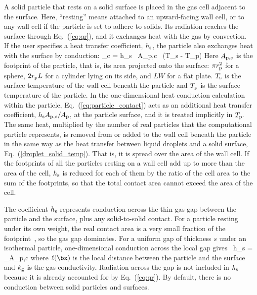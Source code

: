 A solid particle that rests on a solid surface is placed in the gas cell adjacent to the surface. Here, ``resting'' means attached to an upward-facing wall cell, or to any wall cell if the particle is set to adhere to solids. Its radiation reaches the surface through Eq.~(\ref{eq:qr}), and it exchanges heat with the gas by convection. If the user specifies a heat transfer coefficient, $h_{\rm s}$, the particle also exchanges heat with the surface by conduction:
\be
   \dq_{\rm c} = h_{\rm s} \, A_{\rm p,c} \, (T_{\rm s} - T_{\rm p}) \label{eq:particle_contact}
\ee
Here $A_{\rm p,c}$ is the footprint of the particle, that is, its area projected onto the surface: $\pi r_{\rm p}^2$ for a sphere, $2 r_{\rm p} L$ for a cylinder lying on its side, and $L W$ for a flat plate. $T_{\rm s}$ is the surface temperature of the wall cell beneath the particle and $T_{\rm p}$ is the surface temperature of the particle. In the one-dimensional heat conduction calculation within the particle, Eq.~(\ref{eq:particle_contact}) acts as an additional heat transfer coefficient, $h_{\rm s} A_{\rm p,c}/A_{\rm p}$, at the particle surface, and it is treated implicitly in $T_{\rm p}$. The same heat, multiplied by the number of real particles that the computational particle represents, is removed from or added to the wall cell beneath the particle in the same way as the heat transfer between liquid droplets and a solid surface, Eq.~(\ref{droplet_solid_temp}). That is, it is spread over the area of the wall cell. If the footprints of all the particles resting on a wall cell add up to more than the area of the cell, $h_{\rm s}$ is reduced for each of them by the ratio of the cell area to the sum of the footprints, so that the total contact area cannot exceed the area of the cell.

The coefficient $h_{\rm s}$ represents conduction across the thin gas gap between the particle and the surface, plus any solid-to-solid contact. For a particle resting under its own weight, the real contact area is a very small fraction of the footprint~\cite{Cooper:1969}, so the gas gap dominates. For a uniform gap of thickness $s$ under an isothermal particle, one-dimensional conduction across the local gap gives~\cite{Batchelor:1977}
\be
   h_{\rm s} =  \int_{A_{\rm p,c}} 
\ee
where $\ell(\bx)$ is the local distance between the particle and the surface and $k_{\rm g}$ is the gas conductivity. Radiation across the gap is not included in $h_{\rm s}$ because it is already accounted for by Eq.~(\ref{eq:qr}). By default, there is no conduction between solid particles and surfaces.

